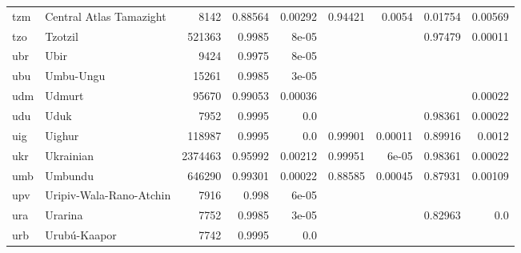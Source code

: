 \documentclass[11pt]{article}
\begin{document}
\begin{table*}[h]
{\begin{tabular}{llrrrrrrr}
tzm         & Central Atlas Tamazight         & 8142         & 0.88564         & 0.00292         & 0.94421         & 0.0054         & 0.01754         & 0.00569         \\

tzo         & Tzotzil         & 521363         & 0.9985         & 8e-05         &          &          & 0.97479         & 0.00011         \\

ubr         & Ubir         & 9424         & 0.9975         & 8e-05         &          &          &          &          \\

ubu         & Umbu-Ungu         & 15261         & 0.9985         & 3e-05         &          &          &          &          \\

udm         & Udmurt         & 95670         & 0.99053         & 0.00036         &          &          &          & 0.00022         \\

udu         & Uduk         & 7952         & 0.9995         & 0.0         &          &          & 0.98361         & 0.00022         \\

uig         & Uighur         & 118987         & 0.9995         & 0.0         & 0.99901         & 0.00011         & 0.89916         & 0.0012         \\

ukr         & Ukrainian         & 2374463         & 0.95992         & 0.00212         & 0.99951         & 6e-05         & 0.98361         & 0.00022         \\

umb         & Umbundu         & 646290         & 0.99301         & 0.00022         & 0.88585         & 0.00045         & 0.87931         & 0.00109         \\

upv         & Uripiv-Wala-Rano-Atchin         & 7916         & 0.998         & 6e-05         &          &          &          &          \\

ura         & Urarina         & 7752         & 0.9985         & 3e-05         &          &          & 0.82963         & 0.0         \\

urb         & Urubú-Kaapor         & 7742         & 0.9995         & 0.0         &          &          &          &          \\


\end{tabular}}
\end{table*}
\end{document}
